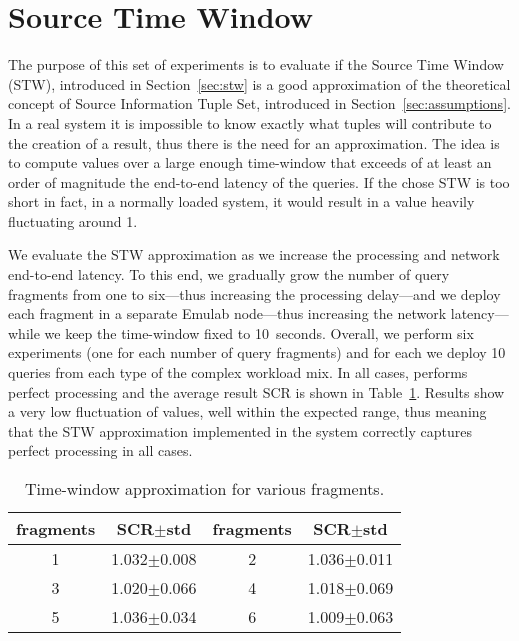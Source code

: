 \section{Source Time Window}
\label{sec:eval_stw}

The purpose of this set of experiments is to evaluate if the Source Time Window (STW), introduced in
Section~\ref{sec:stw} is a good approximation of the theoretical concept of Source Information Tuple
Set, introduced in Section~\ref{sec:assumptions}. In a real system it is impossible to know exactly what
tuples will contribute to the creation of a result, thus there is the need for an approximation. 
The idea is to compute \sic values over a large enough time-window that exceeds of at least an order of
magnitude the end-to-end latency of the queries. If the chose STW is too short in fact, in a normally
loaded system, it would result in a \sic value heavily fluctuating around 1. 

We evaluate the STW approximation as we increase the processing and network end-to-end latency.
To this end, we gradually grow the number of query fragments from one
to six---thus increasing the processing delay---and we deploy each fragment in a separate Emulab 
node---thus increasing the network latency---while we keep the time-window
fixed to 10~seconds. Overall, we perform six
experiments (\ie one for each number of query fragments) and for each we deploy
10 queries from each type of the complex workload mix. In all cases, \sys performs
perfect processing and the average result SCR is shown in Table~\ref{table:time-window}.
Results show a very low fluctuation of values, well within the expected range, thus meaning that the STW
approximation implemented in the \sys system correctly captures perfect processing in all cases.
\begin{table}[h]
  \centering
  \begin{tabular}{c|c||c|c}
    \hline
        fragments & SCR$\pm$std & fragments & SCR$\pm$std \\ \hline
	1 & 1.032$\pm$0.008 & 2 & 1.036$\pm$0.011 \\ \hline
	3 & 1.020$\pm$0.066 & 4 & 1.018$\pm$0.069 \\ \hline
	5 & 1.036$\pm$0.034 & 6 & 1.009$\pm$0.063 \\ \hline
  \end{tabular}
  \caption{Time-window approximation for various fragments.}
  \label{table:time-window}
\end{table}
